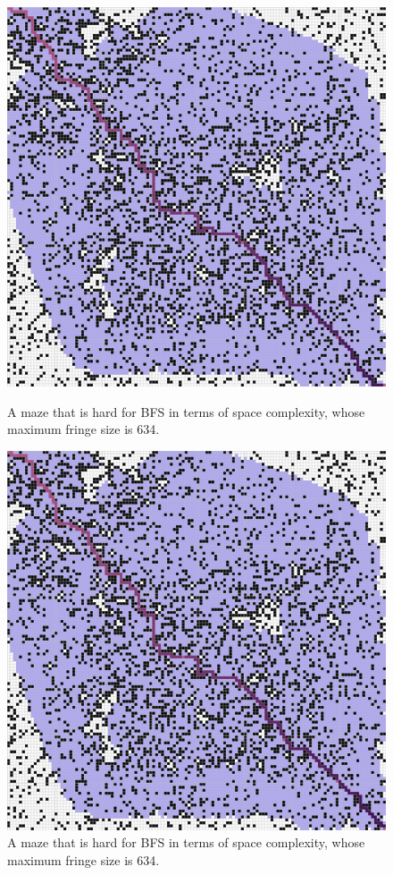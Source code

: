 \documentclass[letter]{article}
\begin{document}
\begin{enumerate}[resume]
\begin{enumerate}
\begin{enumerate}
\begin{figure}
					\includegraphics[width=\textwidth]{../pics/aef/634_2.png}
					\caption{\label{fig:aef2}A maze that is hard for BFS in terms of space complexity, whose maximum fringe size is 634. }
					\endminipage\hfill
					\includegraphics[width=\textwidth]{../pics/aef/634.png}
					\caption{\label{fig:aef3} A maze that is hard for BFS in terms of space complexity, whose maximum fringe size is 634. }
					\endminipage
					\endminipage 
				\end{figure}
				

\end{enumerate}
\end{enumerate}
\end{enumerate}
\end{document}
